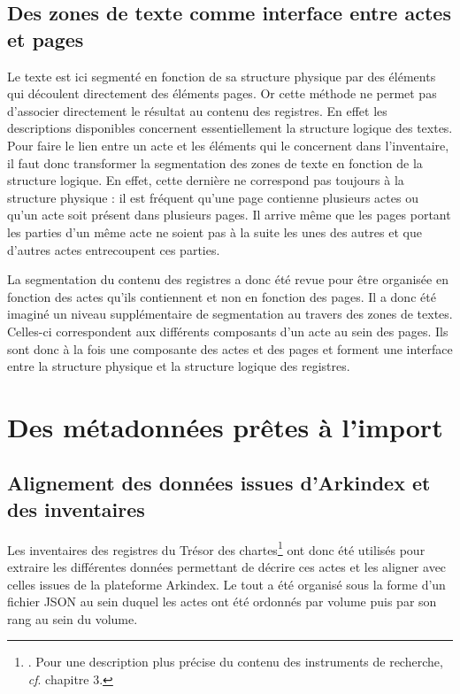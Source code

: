 \documentclass[a4paper,12pt,twoside]{book}
\begin{document}
	
	\subsection{Des zones de texte comme interface entre actes et pages}
	
	Le texte est ici segmenté en fonction de sa structure physique par des éléments qui découlent directement des éléments pages. Or cette méthode ne permet pas d'associer directement le résultat au contenu des registres. En effet les descriptions disponibles concernent essentiellement la structure logique des textes. Pour faire le lien entre un acte et les éléments qui le concernent dans l'inventaire, il faut donc transformer la segmentation des zones de texte en fonction de la structure logique. En effet, cette dernière ne correspond pas toujours à la structure physique : il est fréquent qu'une page contienne plusieurs actes ou qu'un acte soit présent dans plusieurs pages. Il arrive même que les pages portant les parties d'un même acte ne soient pas à la suite les unes des autres et que d'autres actes entrecoupent ces parties.
	
	La segmentation du contenu des registres a donc été revue pour être organisée en fonction des actes qu'ils contiennent et non en fonction des pages. Il a donc été imaginé un niveau supplémentaire de segmentation au travers des zones de textes. Celles-ci correspondent aux différents composants d'un acte au sein des pages. Ils sont donc à la fois une composante des actes et des pages et forment une interface entre la structure physique et la structure logique des registres.
	
	\section{Des métadonnées prêtes à l’import}
	
	\subsection{Alignement des données issues d'Arkindex et des inventaires}
	
	Les inventaires des registres du Trésor des chartes\footnote{\cite{glenisson_registres_1958}. Pour une description plus précise du contenu des instruments de recherche, \textit{cf}. chapitre 3.} ont donc été utilisés pour extraire les différentes données permettant de décrire ces actes et les aligner avec celles issues de la plateforme Arkindex. Le tout a été organisé sous la forme d'un fichier JSON au sein duquel les actes ont été ordonnés par volume puis par son rang au sein du volume.
	
\end{document}
